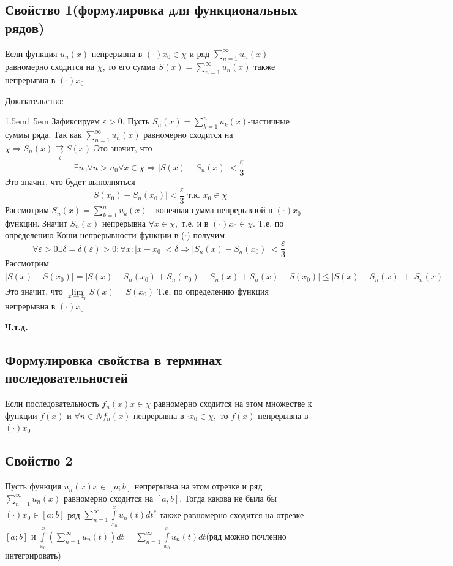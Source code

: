 \documentclass[12pt]{article}
\let\oldint\int
\let\oldsum\sum
\let\oldlim\lim
\renewcommand{\int}{\oldint\limits}
\renewcommand{\sum}{\oldsum\limits}
\renewcommand{\lim}{\oldlim\limits}
\begin{document}
    \subsection*{Свойство 1(формулировка для функциональных рядов)}
    Если функция $u_n(x)$ непрерывна в $(\cdot) x_0 \in \chi$ и 
    ряд $\sum_{n=1}^{\infty} u_n(x)$ равномерно сходится на $\chi$, то его сумма
    $S(x)=\sum_{n=1}^{\infty}u_n(x)$ также непрерывна в $(\cdot) x_0$   

    \underline{Доказательство:}
    \begin{adjustwidth}{1.5em}{1.5em}
      Зафиксируем $\varepsilon >0$. Пусть $S_n(x)=\sum_{k=1}^{n} u_k(x)$-частичные суммы ряда.
      Так как $\sum_{n=1}^{\infty} u_n(x)$ равномерно сходится на $\chi \Rightarrow S_n(x) \underset{\chi}{\rightrightarrows}S(x)$
      Это значит, что
      \[\exists n_0 \forall n>n_0 \forall x \in \chi \Rightarrow |S(x)-S_n(x)|< \dfrac{\varepsilon}{3}\]
      Это значит, что будет выполняться 
      \[|S(x_0)-S_n(x_0)|< \dfrac{\varepsilon}{3} \text{ т.к. } x_0 \in \chi\]
      Рассмотрим $S_n(x)=\sum_{k=1}^{n} u_k(x)$ - конечная сумма непрерывной в $(\cdot) x_0$
      функции. Значит $S_n(x)$ непрерывна $\forall x \in \chi,$ т.е. и в $(\cdot) x_0 \in \chi$.
      Т.е. по определению Коши непрерывности функции в ($\cdot$) получим
      \[\forall \varepsilon > 0 \exists \delta = \delta(\varepsilon) >0: \forall x:|x-x_0|< \delta \Rightarrow |S_n(x)-S_n(x_0)|<\dfrac{\varepsilon}{3} \]
      Рассмотрим $|S(x)-S(x_0)| = |S(x)-S_n(x_0)+S_n(x_0)-S_n(x)+S_n(x)-S(x_0)|\leq
      |S(x)-S_n(x)|+|S_n(x)-S_n(x_0)|+|S_n(x_0)-S(x_0)|\leq \dfrac{\varepsilon}{3}+\dfrac{\varepsilon}{3}+\dfrac{\varepsilon}{3}=\varepsilon$\\
      Это значит, что $\lim_{x \to x_0} S(x)=S(x_0)$ Т.е. по определению функция непрерывна в $(\cdot) x_0$
    \end{adjustwidth}
    \begin{center}
      \textbf{Ч.т.д.}
    \end{center}

    \subsection*{Формулировка свойства в терминах последовательностей}
    Если последовательность $f_n(x) x \in \chi$ равномерно сходится на этом множестве
    к функции $f(x)$ и $\forall n \in N f_n(x)$ непрерывна в $\cdot x_0 \in \chi,$ то $f(x)$ непрерывна
    в $(\cdot) x_0$

    \subsection*{Свойство 2}
    Пусть функция $u_n(x) x \in [a;b]$ непрерывна на этом отрезке и ряд $\sum_{n=1}^{\infty} u_n(x)$ равномерно
    сходится на $[a,b]$. Тогда какова не была бы $(\cdot) x_0 \in [a;b]$ ряд $\sum_{n=1}^{\infty} \int^x_{x_0} u_n(t)
    dt^*$ также равномерно сходится на отрезке $[a;b]$ и $\int^x_{x_0} (\sum_{n=1}^{\infty}u_n(t))dt=
    \sum_{n=1}^{\infty}\int^x_{x_0}u_n(t)dt$(ряд можно почленно интегрировать)
\end{document}
